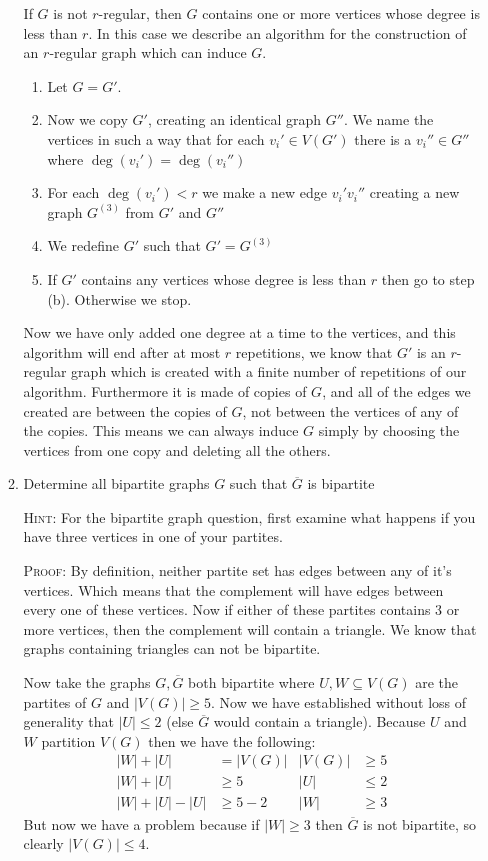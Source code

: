 \documentclass[letterpaper]{article}
\begin{document}
\begin{enumerate}
\begin{enumerate}
  If $G$ is not $r$-regular, then $G$ contains one or more vertices whose degree is less than $r$. In this case we describe an algorithm  for the construction of an $r$-regular graph which can induce $G$.
  \begin{enumerate}
  \item
  Let $G=G'$.
  \item
  Now we copy $G'$, creating an identical graph $G''$. We name the vertices in such a way that for  each $v_i'\in V(G')$ there is a $v_i''\in G''$ where $\deg(v_i')=\deg(v_i'')$
  \item
  For each $\deg(v_i') < r$ we make a new edge $v_i'v_i''$ creating a new graph $G^{(3)}$ from $G'$ and $G''$
  \item
  We redefine $G'$ such that $G'=G^{(3)}$
  \item
  If $G'$ contains any vertices whose degree is less than $r$ then go to step (b). Otherwise we stop.
  \end{enumerate}

  Now we have only added one degree at a time to the vertices, and this algorithm will end after at most $r$ repetitions, we know that $G'$ is an $r$-regular graph which is created with a finite number of repetitions of our algorithm. Furthermore it is made of copies of $G$, and all of the edges we created are between the copies of $G$, not between the vertices of any of the copies. This means we can always induce $G$ simply by choosing the vertices from one copy and deleting all the others.
  \setcounter{enumii}{12}
  \item
  Determine all bipartite graphs $G$ such that $\overline{G}$ is bipartite

  {\scshape Hint:} For the bipartite graph question, first examine what happens if you have three vertices in one of your partites.

  {\scshape Proof:}
  By definition, neither partite set has edges between any of it's vertices.
  Which means that the complement will have edges between every one of these vertices.
  Now if either of these partites contains 3 or more vertices, then the complement will contain a triangle.
  We know that graphs containing triangles can not be bipartite.

  Now take the graphs $G,\overline{G}$ both bipartite where $U,W\subseteq V(G)$ are the partites of $G$ and $|V(G)|\ge 5$.
  Now we have established without loss of generality that $|U|\le 2$ (else $\overline{G}$ would contain a triangle).
  Because $U$ and $W$ partition $V(G)$ then we have the following:
  \begin{align*}
    |W|+|U|&=|V(G)|&
    |V(G)|&\ge 5\\
    |W|+|U|&\ge 5&
    |U|&\le 2\\
    |W|+|U|-|U|&\ge 5-2&
    |W|&\ge 3
  \end{align*}
  But now we have a problem because if $|W|\ge 3$ then $\overline{G}$ is not bipartite, so clearly $|V(G)|\le 4$.


\end{enumerate}
\end{enumerate}
\end{document}
